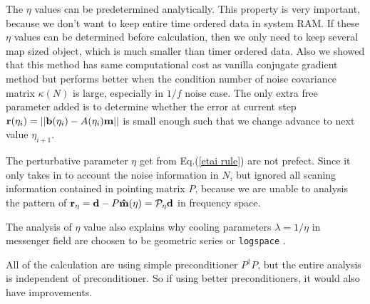 \documentclass[11pt, letterpaper]{article}
\newcommand{\vbd}{\vb{d}}
\newcommand{\vbm}{\vb{m}}
\newcommand{\vbb}{\vb{b}}
\newcommand{\hatm}{\vb{\hat{m}}}
\newcommand{\Pdagger}{P^{\dagger}}
\begin{document}
The $\eta$ values can be predetermined analytically.
This property is very important, because we don't want to keep entire time
ordered data in system RAM.
If these $\eta$ values can be determined before calculation, then we only need
to keep several map sized object, which is much smaller than timer ordered 
data.
Also we showed that this method has same computational cost as vanilla
conjugate gradient method but performs better when the condition number of 
noise covariance matrix $\kappa(N)$ is large, especially in $1/f$ noise case.
The only extra free parameter added is to determine whether the error at
current step $\vb{r}(\eta_i) = \qty||\vbb(\eta_i) - A(\eta_i) \vbm||$ is small
enough such that we change advance to next value $\eta_{i+1}$.

The perturbative parameter $\eta$ get from Eq.(\ref{etai rule}) are not
prefect. Since it only takes in to account the noise information in $N$,
but ignored all scaning information contained in pointing matrix $P$, because
we are unable to analysis the pattern of
$\vb{r}_{\eta} = \vbd - P\hatm(\eta) = \mathcal{P}_{\eta} \vbd$ in frequency
space.

The analysis of $\eta$ value also explains why cooling parameters
$\lambda=1/\eta$ in messenger field are choosen to be geometric series or
\texttt{logspace} \cite{Huffenberger_2018}.

All of the calculation are using simple preconditioner $\Pdagger P$, but 
the entire analysis is independent of preconditioner.
So if using better preconditioners, it would also have improvements.





\medskip



\end{document}
